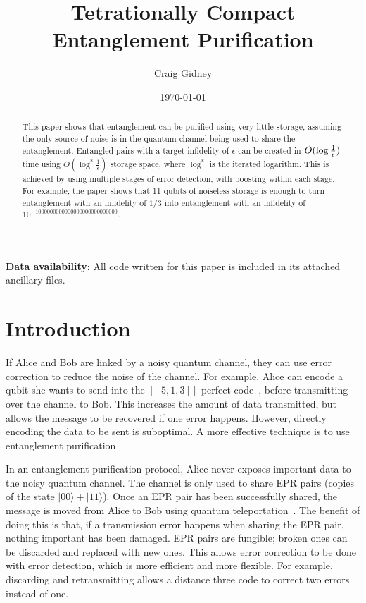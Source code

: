 \documentclass[onecolumn,unpublished,a4paper]{quantumarticle}
\theoremstyle{definition}
\theoremstyle{definition}
\theoremstyle{definition}
\begin{document}
\title{Tetrationally Compact Entanglement Purification}

\date{\today}
\author{Craig Gidney}

\begin{abstract}
This paper shows that entanglement can be purified using very little storage, assuming the only source of noise is in the quantum channel being used to share the entanglement.
Entangled pairs with a target infidelity of $\epsilon$ can be created in $\Tilde{O}(\log \frac{1}{\epsilon})$ time using $O(\log^{\ast} \frac{1}{\epsilon})$ storage space, where $\log^{\ast}$ is the iterated logarithm.
This is achieved by using multiple stages of error detection, with boosting within each stage.
For example, the paper shows that 11 qubits of noiseless storage is enough to turn entanglement with an infidelity of $1/3$ into entanglement with an infidelity of $10^{-1000000000000000000000000000}$.
\end{abstract}

\textbf{Data availability}: All code written for this paper is included in its attached ancillary files.

\tableofcontents

\section{Introduction}
\label{sec:introduction}

If Alice and Bob are linked by a noisy quantum channel, they can use error correction to reduce the noise of the channel.
For example, Alice can encode a qubit she wants to send into the $[[5,1,3]]$ perfect code~\cite{laflamma1996perfectcode}, before transmitting over the channel to Bob.
This increases the amount of data transmitted, but allows the message to be recovered if one error happens.
However, directly encoding the data to be sent is suboptimal.
A more effective technique is to use entanglement purification~\cite{bennett1995eprpurify}.

In an entanglement purification protocol, Alice never exposes important data to the noisy quantum channel.
The channel is only used to share EPR pairs (copies of the state $|00\rangle + |11\rangle$).
Once an EPR pair has been successfully shared, the message is moved from Alice to Bob using quantum teleportation~\cite{bennett1993teleportation}.
The benefit of doing this is that, if a transmission error happens when sharing the EPR pair, nothing important has been damaged.
EPR pairs are fungible; broken ones can be discarded and replaced with new ones.
This allows error correction to be done with error detection, which is more efficient and more flexible.
For example, discarding and retransmitting allows a distance three code to correct two errors instead of one.
\end{document}
